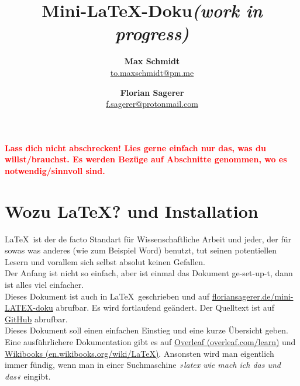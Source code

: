 \documentclass[titlepage]{article}
\begin{document}
\title{\Huge\textbf{Mini-\LaTeX-Doku}\Large \textit{(work in progress)}}
\author{\textbf{Max Schmidt} \\ \href{mailto:to.maxschmidt@pm.me}{to.maxschmidt@pm.me}
   \and \textbf{Florian Sagerer} \\ \href{mailto:f.sagerer@protonmail.com}{f.sagerer@protonmail.com} }


\maketitle
\thispagestyle{empty}

\newpage
\thispagestyle{empty}
\tableofcontents

\newpage
\begin{center}
{\setlength{\parindent}{0cm}
\large{\textcolor{red}{\textbf{Lass dich nicht abschrecken! Lies gerne einfach nur das, was du willst/brauchst. Es werden Bezüge auf Abschnitte genommen, wo es notwendig/sinnvoll sind.}}}
}
\end{center}





\setcounter{page}{3}

\section{Wozu \LaTeX? und Installation}



\LaTeX\ ist der de facto Standart für Wissenschaftliche Arbeit und jeder, der für sowas was anderes (wie zum Beispiel Word) benutzt, tut seinen potentiellen Lesern und vorallem sich selbst absolut keinen Gefallen. \\
Der Anfang ist nicht so einfach, aber ist einmal das Dokument ge-set-up-t, dann ist alles viel einfacher. \\

Dieses Dokument ist auch in \LaTeX\ geschrieben und auf \href{https://floriansagerer.de/mini-LATEX-doku/}{floriansagerer.de/mini-LATEX-doku} abrufbar. 
Es wird fortlaufend geändert.
Der Quelltext ist auf \href{https://github.com/maxschm1dt/mini-LATEX-doku}{GitHub} abrufbar.\\

Dieses Dokument soll einen einfachen Einstieg und eine kurze Übersicht geben.
Eine ausführlichere Dokumentation gibt es auf \href{https://www.overleaf.com/learn}{Overleaf (overleaf.com/learn)} und \href{https://en.wikibooks.org/wiki/LaTeX}{Wikibooks (en.wikibooks.org/wiki/LaTeX)}. Ansonsten wird man eigentlich immer fündig, wenn man in einer Suchmaschine \textit{»latex wie mach ich das und das«} eingibt.
\end{document}
